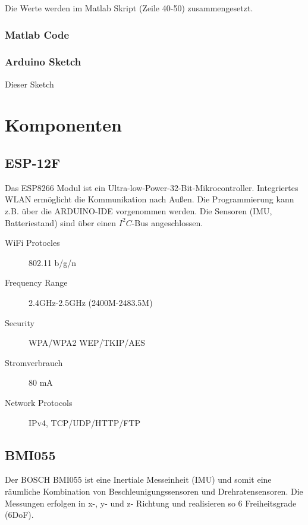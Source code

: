 \documentclass[10pt, a4paper, onecolumn]{article} %
\begin{document}
 Die Werte werden im Matlab Skript  (Zeile 40-50) zusammengesetzt.
\subsubsection{Matlab Code}



\subsubsection{ Arduino Sketch}
Dieser Sketch 




\section{Komponenten}

\subsection{ESP-12F}
\label{ESP-12F}
Das ESP8266 Modul ist ein Ultra-low-Power-32-Bit-Mikrocontroller.  Integriertes WLAN ermöglicht die Kommunikation nach Außen.  
Die Programmierung kann z.B. über die ARDUINO-IDE vorgenommen werden. Die Sensoren (IMU, Batteriestand) sind über einen $I^2C$-Bus angeschlossen.
\begin{description}
	\item[WiFi Protocles] 802.11 b/g/n
	\item[Frequency Range ] 2.4GHz-2.5GHz (2400M-2483.5M)
	\item[Security] WPA/WPA2  WEP/TKIP/AES
	\item[Stromverbrauch] 80 mA
	\item[Network Protocols] IPv4, TCP/UDP/HTTP/FTP
\end{description}
\subsection{BMI055}
\label{BMI055}
Der BOSCH BMI055 ist eine Inertiale Messeinheit (IMU) und somit  eine räumliche Kombination von Beschleunigungssensoren  und Drehratensensoren. Die Messungen erfolgen in x-, y- und z- Richtung und realisieren so  6 Freiheitsgrade (6DoF). 
\end{document}
